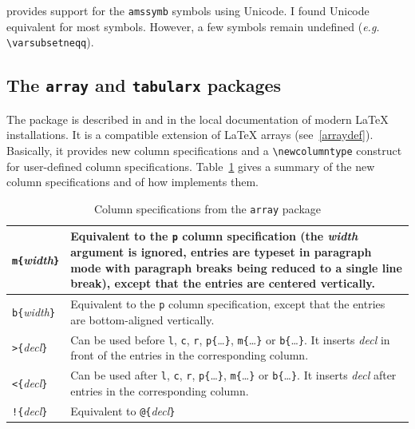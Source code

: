 %
\hevea{} provides support for the \texttt{amssymb} symbols using
Unicode. I found Unicode equivalent for most symbols. However, a few symbols
remain undefined (\emph{e.g.} \verb+\varsubsetneqq+).

\subsection{The \texttt{array} and \texttt{tabularx}
packages}\label{arraypack}
%
The 
package is described in
\cite[Section~5.3]{latexbis} and in the local documentation of modern \LaTeX{}
installations.
It is a compatible extension of \LaTeX{} arrays (see~\ref{arraydef}).
Basically, it provides new column specifications
and a \verb+\newcolumntype+ construct for user-defined  column
specifications.
Table~\ref{arraytable} gives a summary of the new column
specifications and of how \hevea{}
implements them.
\begin{table}
\caption{\label{arraytable} Column specifications from the
\texttt{array} package}
\begin{center}
\begin{tabular*}{.7\linewidth}{l@{\quad}p{.5\linewidth}}\hline
\verb+m{+\textit{width}\verb+}+ &
Equivalent to the \verb+p+ column specification (the \textit{width}
argument is ignored, entries are typeset in paragraph mode with
paragraph breaks being reduced to a single line break), except that the entries
are centered vertically.\\ \hline
\verb+b{+\textit{width}\verb+}+ &
Equivalent to the \verb+p+ column specification, except that the entries
are bottom-aligned vertically.\\ \hline
\verb+>{+\textit{decl}\verb+}+ &
Can be used before \verb+l+, \verb+c+, \verb+r+,
\verb+p{+\ldots\verb+}+, \verb+m{+\ldots\verb+}+ or
\verb+b{+\ldots\verb+}+.
It inserts \textit{decl} in front of the entries in the corresponding
column. \\ \hline
\verb+<{+\textit{decl}\verb+}+ &
Can be used after \verb+l+, \verb+c+, \verb+r+,
\verb+p{+\ldots\verb+}+, \verb+m{+\ldots\verb+}+ or
\verb+b{+\ldots\verb+}+.
It inserts \textit{decl} after entries in the corresponding
column. \\ \hline
\verb+!{+\textit{decl}\verb+}+ &
Equivalent to \verb+@{+\textit{decl}\verb+}+ \\ \hline
\end{tabular*}
\end{center}
\end{table}

